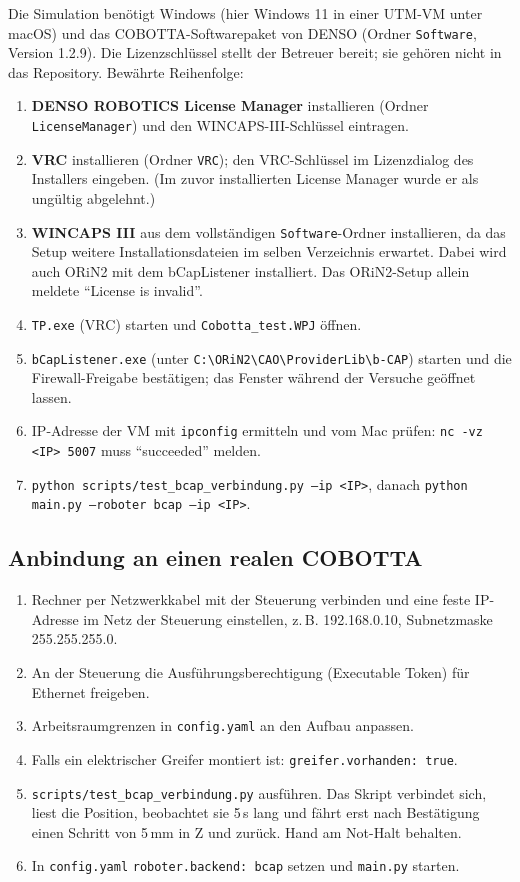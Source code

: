 \documentclass[11pt,a4paper]{article}
\newcommand{\datei}[1]{\texttt{#1}}
\begin{document}
Die Simulation benötigt Windows (hier Windows 11 in einer UTM-VM unter macOS) und das
COBOTTA-Softwarepaket von DENSO (Ordner \datei{Software}, Version 1.2.9). Die Lizenzschlüssel
stellt der Betreuer bereit; sie gehören nicht in das Repository. Bewährte Reihenfolge:
\begin{enumerate}
  \item \textbf{DENSO ROBOTICS License Manager} installieren (Ordner \datei{LicenseManager}) und
        den WINCAPS-III-Schlüssel eintragen.
  \item \textbf{VRC} installieren (Ordner \datei{VRC}); den VRC-Schlüssel im Lizenzdialog des
        Installers eingeben. (Im zuvor installierten License Manager wurde er als ungültig abgelehnt.)
  \item \textbf{WINCAPS III} aus dem vollständigen \datei{Software}-Ordner installieren, da das Setup
        weitere Installationsdateien im selben Verzeichnis erwartet. Dabei wird auch ORiN2 mit dem
        bCapListener installiert. Das ORiN2-Setup allein meldete \enquote{License is invalid}.
  \item \datei{TP.exe} (VRC) starten und \datei{Cobotta\_test.WPJ} öffnen.
  \item \datei{bCapListener.exe} (unter \datei{C:\textbackslash ORiN2\textbackslash CAO\textbackslash ProviderLib\textbackslash b-CAP})
        starten und die Firewall-Freigabe bestätigen; das Fenster während der Versuche geöffnet lassen.
  \item IP-Adresse der VM mit \texttt{ipconfig} ermitteln und vom Mac prüfen:
        \texttt{nc -vz <IP> 5007} muss \enquote{succeeded} melden.
  \item \texttt{python scripts/test\_bcap\_verbindung.py --ip <IP>}, danach
        \texttt{python main.py --roboter bcap --ip <IP>}.
\end{enumerate}

\subsection{Anbindung an einen realen COBOTTA}

\begin{enumerate}
  \item Rechner per Netzwerkkabel mit der Steuerung verbinden und eine feste IP-Adresse im Netz der
        Steuerung einstellen, z.\,B. 192.168.0.10, Subnetzmaske 255.255.255.0.
  \item An der Steuerung die Ausführungsberechtigung (Executable Token) für Ethernet freigeben.
  \item Arbeitsraumgrenzen in \datei{config.yaml} an den Aufbau anpassen.
  \item Falls ein elektrischer Greifer montiert ist: \texttt{greifer.vorhanden: true}.
  \item \datei{scripts/test\_bcap\_verbindung.py} ausführen. Das Skript verbindet sich, liest die
        Position, beobachtet sie 5\,s lang und fährt erst nach Bestätigung einen Schritt von 5\,mm in
        Z und zurück. Hand am Not-Halt behalten.
  \item In \datei{config.yaml} \texttt{roboter.backend: bcap} setzen und \datei{main.py} starten.
\end{enumerate}
\end{document}
